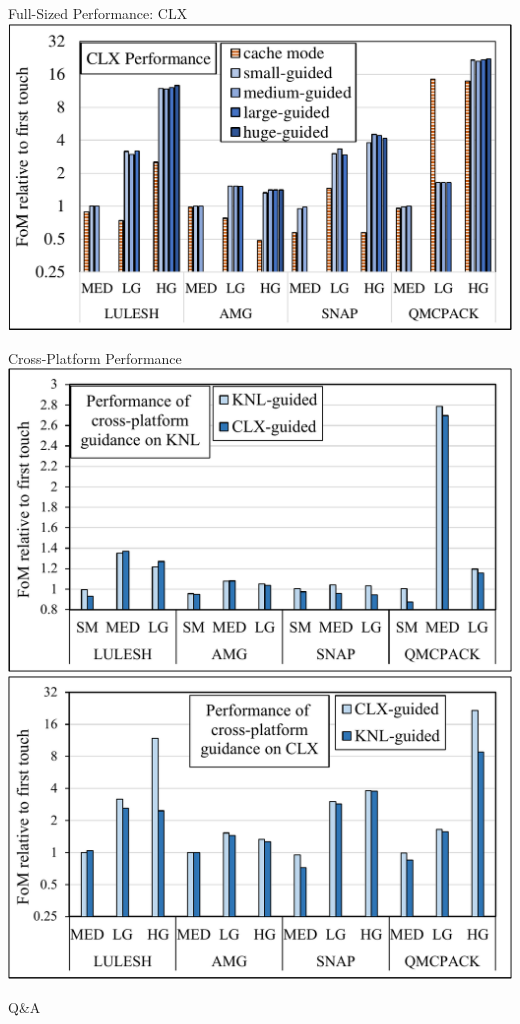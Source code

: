 \documentclass[final,hyperref={pdfpagelabels=false}]{beamer}
\begin{document}
\begin{frame}{Full-Sized Performance: CLX}
  \centering
  \includegraphics[width=.9\textwidth]{figures/aep_perf.pdf}
\end{frame}

\begin{frame}{Cross-Platform Performance}
  \centering
  \includegraphics[width=.6\textwidth]{figures/knl_cross.pdf}
  \\
  \includegraphics[width=.6\textwidth]{figures/aep_cross.pdf}
\end{frame}

\begin{frame}{Q\&A}
\end{frame}
\end{document}
